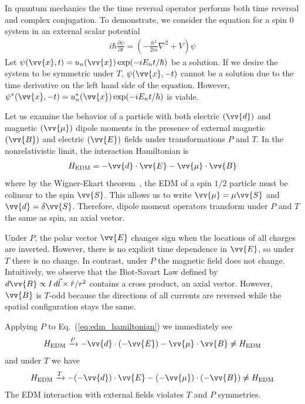In quantum mechanics the the time reversal operator performs both time reversal and complex conjugation. To demonstrate, we consider the \schrodinger equation for a spin 0 system in an external scalar potential
%
\begin{gather}
    i\hbar\frac{\partial \psi}{\partial t} = \left(-\frac{\hbar^2}{2m}\nabla^2 + V \right) \psi
\end{gather}
%
Let $\psi(\vv{x}, t)=u_n(\vv{x})\exp(-iE_nt/\hbar)$ be a solution. If we desire the system to be symmetric under $T$, $\psi(\vv{x}, -t)$ cannot be a solution due to the time derivative on the left hand side of the equation. However, $\psi^*(\vv{x}, -t)=u_n^*(\vv{x})\exp(-iE_nt/\hbar)$ is viable.

Let us examine the behavior of a particle with both electric $(\vv{d})$ and magnetic $(\vv{\mu})$ dipole moments in the presence of external magnetic $(\vv{B})$ and electric $(\vv{E})$ fields under transformations $P$ and $T$. In the nonrelativistic limit, the interaction Hamiltonian is 
%
\begin{gather}
    H_\text{EDM} = -\vv{d}\cdot\vv{E}-\vv{\mu}\cdot\vv{B} \label{eq:edm_hamiltonian}
\end{gather}
%
where by the Wigner-Ekart theorem~\cite{sakurai_quantum}, the EDM of a spin $1/2$ particle must be colinear to the spin $\vv{S}$. This allows us to write $\vv{\mu}=\mu\vv{S}$ and $\vv{d}=\delta\vv{S}$. Therefore, dipole moment operators transform under $P$ and $T$ the same as spin, an axial vector.

Under $P$, the polar vector $\vv{E}$ changes sign when the locations of all charges are inverted. However, there is no explicit time dependence in $\vv{E}$, so under $T$ there is no change. In contrast, under $P$ the magnetic field does not change. Intuitively, we observe that the Biot-Savart Law defined by $d\vv{B}\propto I\,d\vec{l} \times \hat{r} /r^2$ contains a cross product, an axial vector. However, $\vv{B}$ is $T$-odd because the directions of all currents are reversed while the spatial configuration stays the same. 

Applying $P$ to Eq.~(\ref{eq:edm_hamiltonian}) we immediately see
%
\begin{gather}
    H_\text{EDM}\xrightarrow{P} -\vv{d}\cdot(-\vv{E}) - \vv{\mu}\cdot\vv{B} \neq H_\text{EDM}
\end{gather}
%
and under $T$ we have
%
\begin{gather}
    H_\text{EDM}\xrightarrow{T} -(-\vv{d})\cdot\vv{E} - (-\vv{\mu})\cdot(-\vv{B}) \neq H_\text{EDM}
\end{gather}
%
The EDM interaction with external fields violates $T$ and $P$ symmetries. 


